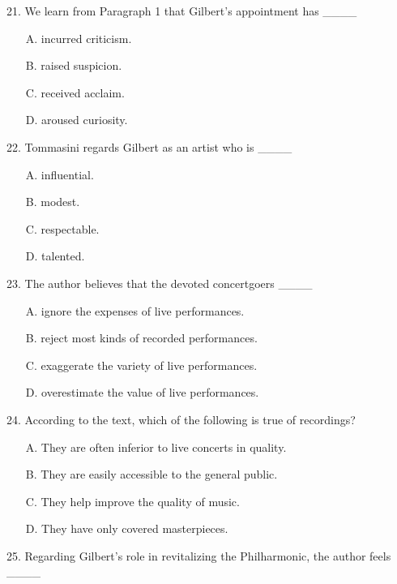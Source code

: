 \documentclass[UTF8,11pt]{ctexart}
\begin{document}
21. We learn from Paragraph 1 that Gilbert's appointment has \_\_\_\_


\begin{itemize}[leftmargin=2em,itemsep=.2em,topsep=.4em]\item[A.] incurred criticism.
\item[B.] raised suspicion.
\item[C.] received acclaim.
\item[D.] aroused curiosity.
\end{itemize}

22. Tommasini regards Gilbert as an artist who is \_\_\_\_


\begin{itemize}[leftmargin=2em,itemsep=.2em,topsep=.4em]\item[A.] influential.
\item[B.] modest.
\item[C.] respectable.
\item[D.] talented.
\end{itemize}

23. The author believes that the devoted concertgoers \_\_\_\_


\begin{itemize}[leftmargin=2em,itemsep=.2em,topsep=.4em]\item[A.] ignore the expenses of live performances.
\item[B.] reject most kinds of recorded performances.
\item[C.] exaggerate the variety of live performances.
\item[D.] overestimate the value of live performances.
\end{itemize}

24. According to the text, which of the following is true of recordings?


\begin{itemize}[leftmargin=2em,itemsep=.2em,topsep=.4em]\item[A.] They are often inferior to live concerts in quality.
\item[B.] They are easily accessible to the general public.
\item[C.] They help improve the quality of music.
\item[D.] They have only covered masterpieces.
\end{itemize}

25. Regarding Gilbert's role in revitalizing the Philharmonic, the author feels \_\_\_\_
\end{document}

